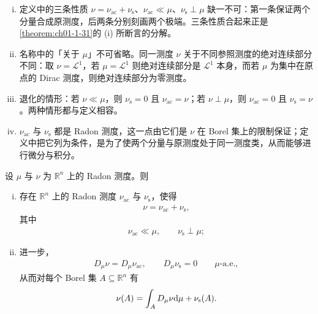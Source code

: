 \documentclass[../../main.tex]{subfiles}%
\begin{document}
\begin{remark}\label{remark:ch01-def-1-23-条件}
\begin{enumerate}[(i)]
\item 定义中的三条性质 $\nu=\nu_{\mathrm{ac}}+\nu_{\mathrm{s}}$、$\nu_{\mathrm{ac}}\ll\mu$、$\nu_{\mathrm{s}}\perp\mu$ 缺一不可：第一条保证两个分量合成原测度，后两条分别刻画两个极端。三条性质合起来正是\cref{theorem:ch01-1-31}的 (i) 所断言的分解。%
\item 名称中的「关于 $\mu$」不可省略。同一测度 $\nu$ 关于不同参照测度的绝对连续部分不同：取 $\nu=\mathcal{L}^1$，若 $\mu=\mathcal{L}^1$ 则绝对连续部分是 $\mathcal{L}^1$ 本身，而若 $\mu$ 为集中在原点的 Dirac 测度，则绝对连续部分为零测度。
\item 退化的情形：若 $\nu\ll\mu$，则 $\nu_{\mathrm{s}}=0$ 且 $\nu_{\mathrm{ac}}=\nu$；若 $\nu\perp\mu$，则 $\nu_{\mathrm{ac}}=0$ 且 $\nu_{\mathrm{s}}=\nu$。两种情形都与定义相容。
\item $\nu_{\mathrm{ac}}$ 与 $\nu_{\mathrm{s}}$ 都是 Radon 测度，这一点由它们是 $\nu$ 在 Borel 集上的限制保证；定义中把它列为条件，是为了使两个分量与原测度处于同一测度类，从而能够进行微分与积分。
\end{enumerate}
\end{remark}

\begin{theorem}\label{theorem:ch01-1-31}
设 $\mu$ 与 $\nu$ 为 $\mathbb{R}^n$ 上的 Radon 测度。则
\begin{enumerate}[(i)]
\item 存在 $\mathbb{R}^n$ 上的 Radon 测度 $\nu_{\mathrm{ac}}$ 与 $\nu_{\mathrm{s}}$，使得
\begin{align*}
\nu=\nu_{\mathrm{ac}}+\nu_{\mathrm{s}},
\end{align*}
其中
\begin{align*}
\nu_{\mathrm{ac}}\ll\mu,\qquad \nu_{\mathrm{s}}\perp\mu ;
\end{align*}
\item 进一步，
\begin{align*}
D_{\mu}\nu=D_{\mu}\nu_{\mathrm{ac}},\qquad D_{\mu}\nu_{\mathrm{s}}=0\qquad \mu\text{-a.e.},
\end{align*}
从而对每个 Borel 集 $A\subseteq\mathbb{R}^n$ 有
\begin{align*}
\nu(A)=\int_A D_{\mu}\nu\mathrm{d}\mu+\nu_{\mathrm{s}}(A).
\end{align*}
\end{enumerate}
\end{theorem}
\end{document}

